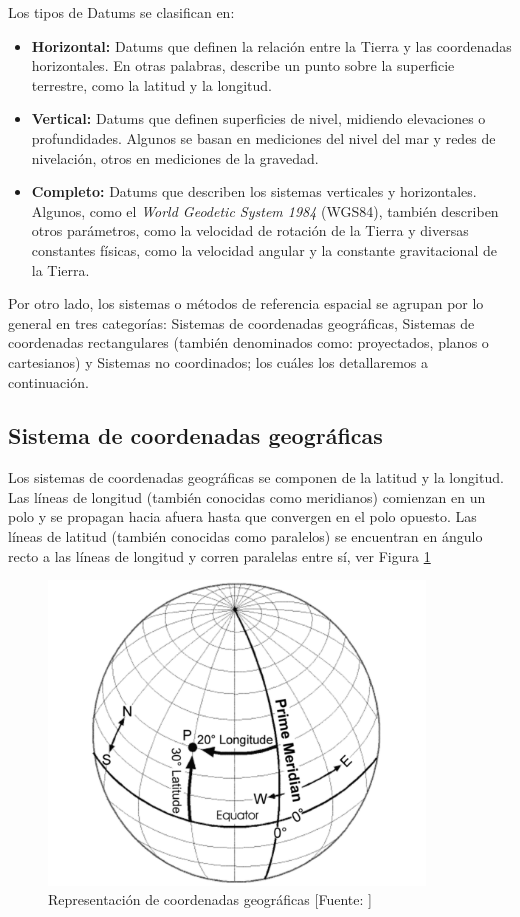 Los tipos de Datums se clasifican en:
\begin{itemize}
    \item \textbf{Horizontal:} 
    Datums que definen la relación entre la Tierra y las coordenadas horizontales. En otras palabras, describe un punto sobre la superficie terrestre, como la latitud y la longitud.
    \item \textbf{Vertical:} 
    Datums que definen superficies de nivel, midiendo elevaciones o profundidades. Algunos se basan en mediciones del nivel del mar y redes de nivelación, otros en mediciones de la gravedad.
    \item \textbf{Completo:} 
    Datums que describen los sistemas verticales y horizontales. Algunos, como el \textit{World Geodetic System 1984} (WGS84), también describen otros parámetros, como la velocidad de rotación de la Tierra y diversas constantes físicas, como la velocidad angular y la constante gravitacional de la Tierra.
\end{itemize}

Por otro lado, los sistemas o métodos de referencia espacial se agrupan por lo general en tres categorías: Sistemas de coordenadas geográficas, Sistemas de coordenadas rectangulares (también denominados como: proyectados, planos o cartesianos) y Sistemas no coordinados; los cuáles los detallaremos a continuación.

\subsection{Sistema de coordenadas geográficas}
Los sistemas de coordenadas geográficas se componen de la latitud y la longitud. Las líneas de longitud (también conocidas como meridianos) comienzan en un polo y se propagan hacia afuera hasta que convergen en el polo opuesto. Las líneas de latitud (también conocidas como paralelos) se encuentran en ángulo recto a las líneas de longitud y corren paralelas entre sí, ver Figura \ref{fig:mapaCoordenadasGeograficas} 

\begin{figure}[H]
    \centering
    \includegraphics[width=10cm]{CoordenadasGeograficas.png}
    \caption{Representación de coordenadas geográficas [Fuente: ]}
    \label{fig:mapaCoordenadasGeograficas}
\end{figure}

